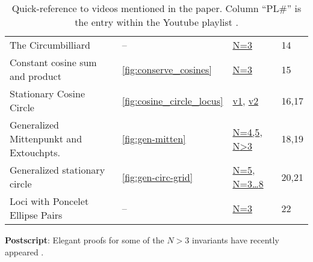 \begin{table}[H]
\begin{tabular}{llll}
{The Circumbilliard} &
-- &
\href{https://youtu.be/vSCnorIJ2X8}{N=3} &
{14} \\

{Constant cosine sum and product} &
\ref{fig:conserve_cosines} &
\href{https://youtu.be/P8ykpE_ZbZ8}{N=3} &
{15} \\

{Stationary Cosine Circle} &
\ref{fig:cosine_circle_locus} &
\href{https://youtu.be/CrOSI8d8qDc}{v1},{ }
\href{https://youtu.be/hCQIT6_XhaQ}{v2} & 
{16,17} \\

{Generalized Mittenpunkt and Extouchpts.} &
\ref{fig:gen-mitten} &
\href{https://youtu.be/Bpc-MrR2IMc}{N=4,5},{ }
\href{https://youtu.be/TV2p7fPlYfE}{N{\textgreater}3} &
{18,19} \\

{Generalized stationary circle} &
\ref{fig:gen-circ-grid} &
\href{https://youtu.be/dINE4aH1cvk}{N=5},{ } \href{https://youtu.be/EFeINGIDFrg}{N=3\ldots{8}} &
{20,21} \\

{Loci with Poncelet Ellipse Pairs} &
-- &
\href{https://youtu.be/B5dRXT8Xerw}{N=3} &
{22}
\end{tabular}
\caption{Quick-reference to videos mentioned in the paper. Column ``PL\#'' is the entry within the Youtube playlist \cite{dsr_math_intell_playlist}.}
\label{tab:playlist}
\end{table}

\noindent \textbf{Postscript}: Elegant proofs for some of the $N>3$ invariants have recently appeared \cite{akopyan2020-invariants,bialy2020-invariants}.
